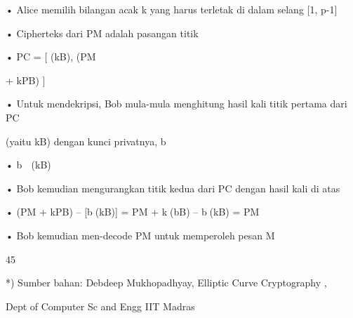\documentclass{article}
\begin{document}

• Alice memilih bilangan acak k yang harus terletak di dalam selang [1, p-1]

• Cipherteks dari PM  adalah pasangan titik

• PC = [ (kB), (PM

 + kPB) ]


• Untuk mendekripsi, Bob mula-mula menghitung hasil kali titik pertama dari PC 

(yaitu kB) dengan kunci privatnya, b

• b  (kB)

• Bob kemudian mengurangkan titik kedua  dari PC dengan hasil kali di atas

• (PM + kPB) – [b(kB)] = PM + k(bB) – b(kB) = PM

• Bob kemudian men-decode PM untuk memperoleh pesan M

45

*) Sumber bahan: Debdeep Mukhopadhyay, Elliptic Curve Cryptography ,

 Dept of Computer Sc and Engg IIT Madras
\end{document}
